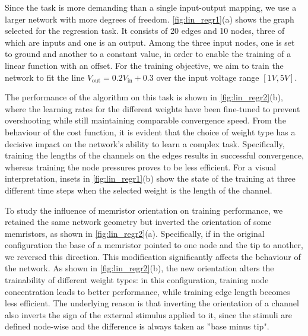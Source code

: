 \documentclass[reprint,superscriptaddress,prb,showkeys]{revtex4-2}
\begin{document}
Since the task is more demanding than a single input-output mapping, we use a larger network with more degrees of freedom. \cref{fig:lin_regr1}(a) shows the graph selected for the regression task. It consists of 20 edges and 10 nodes, three of which are inputs and one is an output. Among the three input nodes, one is set to ground and another to a constant value, in order to enable the training of a linear function with an offset. For the training objective, we aim to train the network to fit the line $V_{\text{out}} = 0.2 V_{\text{in}} + 0.3$ over the input voltage range $[1V, 5V]$.

The performance of the algorithm on this task is shown in \cref{fig:lin_regr2}(b), where the learning rates for the different weights have been fine-tuned to prevent overshooting while still maintaining comparable convergence speed. From the behaviour of the cost function, it is evident that the choice of weight type has a decisive impact on the network’s ability to learn a complex task. Specifically, training the lengths of the channels on the edges results in successful convergence, whereas training the node pressures proves to be less efficient. For a visual interpretation, insets in \cref{fig:lin_regr1}(b) show the state of the training at three different time steps when the selected weight is the length of the channel.

To study the influence of memristor orientation on training performance, we retained the same network geometry but inverted the orientation of some memristors, as shown in \cref{fig:lin_regr2}(a). Specifically, if in the original configuration the base of a memristor pointed to one node and the tip to another, we reversed this direction. This modification significantly affects the behaviour of the network. As shown in \cref{fig:lin_regr2}(b), the new orientation alters the trainability of different weight types: in this configuration, training node concentration leads to better performance, while training edge length becomes less efficient. The underlying reason is that inverting the orientation of a channel also inverts the sign of the external stimulus applied to it, since the stimuli are defined node-wise and the difference is always taken as ''base minus tip".
\end{document}
